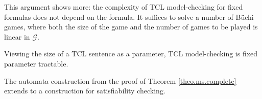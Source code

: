 This argument shows more: the complexity of TCL model-checking for fixed formulas does not depend on the formula.
It suffices to solve a number of B\"uchi games, where both the size of the game and the number of games to be played is linear in $\mathcal G$.

\begin{corollary}
Viewing the size of a TCL sentence as a parameter, TCL model-checking is fixed parameter tractable.
\end{corollary}

The automata construction from the proof of Theorem \ref{theo.ms.complete} extends to a construction for satisfiability checking.

